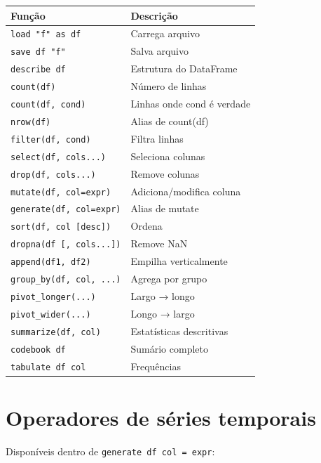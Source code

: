 \begin{center}
\begin{tabular}{ll}
\toprule
\textbf{Função} & \textbf{Descrição} \\
\midrule
\texttt{load "f" as df}           & Carrega arquivo \\
\texttt{save df "f"}              & Salva arquivo \\
\texttt{describe df}              & Estrutura do DataFrame \\
\texttt{count(df)}                & Número de linhas \\
\texttt{count(df, cond)}          & Linhas onde cond é verdade \\
\texttt{nrow(df)}                 & Alias de count(df) \\
\texttt{filter(df, cond)}         & Filtra linhas \\
\texttt{select(df, cols...)}      & Seleciona colunas \\
\texttt{drop(df, cols...)}        & Remove colunas \\
\texttt{mutate(df, col=expr)}     & Adiciona/modifica coluna \\
\texttt{generate(df, col=expr)}   & Alias de mutate \\
\texttt{sort(df, col [desc])}     & Ordena \\
\texttt{dropna(df [, cols...])}   & Remove NaN \\
\texttt{append(df1, df2)}         & Empilha verticalmente \\
\texttt{group\_by(df, col, ...)}  & Agrega por grupo \\
\texttt{pivot\_longer(...)}       & Largo → longo \\
\texttt{pivot\_wider(...)}        & Longo → largo \\
\texttt{summarize(df, col)}       & Estatísticas descritivas \\
\texttt{codebook df}              & Sumário completo \\
\texttt{tabulate df col}          & Frequências \\
\bottomrule
\end{tabular}
\end{center}

\section{Operadores de séries temporais}

Disponíveis dentro de \lstinline{generate df col = expr}:

